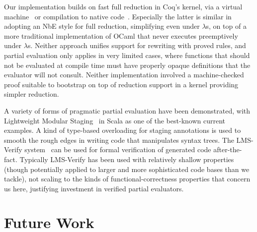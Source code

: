 \documentclass[sigplan,10pt,review,anonymous]{acmart}\settopmatter{printfolios=true,printccs=false,printacmref=false}
\begin{document}
Our implementation builds on fast full reduction in Coq's kernel, via a virtual machine~\cite{vmcompute} or compilation to native code~\cite{nativecompute}.
Especially the latter is similar in adopting an NbE style for full reduction, simplifying even under $\lambda$s, on top of a more traditional implementation of OCaml that never executes preemptively under $\lambda$s.
Neither approach unifies support for rewriting with proved rules, and partial evaluation only applies in very limited cases, where functions that should not be evaluated at compile time must have properly opaque definitions that the evaluator will not consult.
Neither implementation involved a machine-checked proof suitable to bootstrap on top of reduction support in a kernel providing simpler reduction.


A variety of forms of pragmatic partial evaluation have been demonstrated, with Lightweight Modular Staging~\cite{LMS} in Scala as one of the best-known current examples.
A kind of type-based overloading for staging annotations is used to smooth the rough edges in writing code that manipulates syntax trees.
The LMS-Verify system~\cite{LMSVerify} can be used for formal verification of generated code after-the-fact.
Typically LMS-Verify has been used with relatively shallow properties (though potentially applied to larger and more sophisticated code bases than we tackle), not scaling to the kinds of functional-correctness properties that concern us here, justifying investment in verified partial evaluators.

\section{Future Work}
\end{document}
